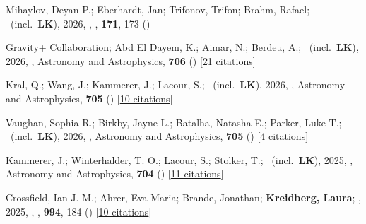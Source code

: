 \item[{\color{numcolor}\scriptsize153}] Mihaylov, Deyan P.; Eberhardt, Jan; Trifonov, Trifon; Brahm, Rafael; \etal\ (incl.\ \textbf{LK}), 2026, , \aj, \textbf{171}, 173 ()

\item[{\color{numcolor}\scriptsize152}] Gravity+ Collaboration; Abd El Dayem, K.; Aimar, N.; Berdeu, A.; \etal\ (incl.\ \textbf{LK}), 2026, , Astronomy and Astrophysics, \textbf{706} () [\href{https://ui.adsabs.harvard.edu/abs/2026A&A...706A..99G}{21 citations}]

\item[{\color{numcolor}\scriptsize151}] Kral, Q.; Wang, J.; Kammerer, J.; Lacour, S.; \etal\ (incl.\ \textbf{LK}), 2026, , Astronomy and Astrophysics, \textbf{705} () [\href{https://ui.adsabs.harvard.edu/abs/2026A&A...705A.217K}{10 citations}]

\item[{\color{numcolor}\scriptsize150}] Vaughan, Sophia R.; Birkby, Jayne L.; Batalha, Natasha E.; Parker, Luke T.; \etal\ (incl.\ \textbf{LK}), 2026, , Astronomy and Astrophysics, \textbf{705} () [\href{https://ui.adsabs.harvard.edu/abs/2026A&A...705A..27V}{4 citations}]

\item[{\color{numcolor}\scriptsize149}] Kammerer, J.; Winterhalder, T. O.; Lacour, S.; Stolker, T.; \etal\ (incl.\ \textbf{LK}), 2025, , Astronomy and Astrophysics, \textbf{704} () [\href{https://ui.adsabs.harvard.edu/abs/2025A&A...704A.318K}{11 citations}]

\item[{\color{numcolor}\scriptsize148}] Crossfield, Ian J. M.; Ahrer, Eva-Maria; Brande, Jonathan; \textbf{Kreidberg, Laura}; \etal, 2025, , \apj, \textbf{994}, 184 () [\href{https://ui.adsabs.harvard.edu/abs/2025ApJ...994..184C}{10 citations}]

